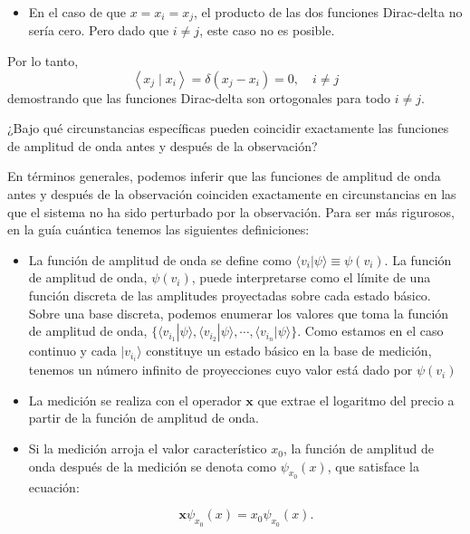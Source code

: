 \begin{problema}
\begin{sol}
\begin{itemize}
    \item En el caso de que $x = x_i = x_j$, el producto de las dos funciones Dirac-delta no sería cero. Pero dado que $i \neq j$, este caso no es posible.
\end{itemize}
Por lo tanto, 
$$\left\langle x_j \mid x_i\right\rangle=\delta\left(x_j-x_i\right)=0, \quad i\neq j$$
demostrando que las funciones Dirac-delta son ortogonales para todo $i\neq j$. 
    \end{sol}
\end{problema}

\begin{problema}
    ¿Bajo qué circunstancias específicas pueden coincidir exactamente las funciones de amplitud de onda antes y después de la observación?
    \begin{sol}
        En términos generales, podemos inferir que las funciones de amplitud de onda antes y después de la observación coinciden exactamente en circunstancias en las que el sistema no ha sido perturbado por la observación. Para ser más rigurosos, en la guía cuántica tenemos las siguientes definiciones: 
        \begin{itemize}
            \item La función de amplitud de onda se define como $\langle v_i|\psi \rangle \equiv \psi(v_i)$. La función de amplitud de onda, $\psi(v_i)$, puede interpretarse como el límite de una función discreta de las amplitudes proyectadas sobre cada estado básico. Sobre una base discreta, podemos enumerar los valores que toma la función de amplitud de onda, $\{\langle v_{i_1}|\psi \rangle  , \langle v_{i_2}|\psi \rangle  , \cdots , \langle v_{i_n}|\psi \rangle  \}$. Como estamos en el caso continuo y cada $| v_{i_i} \rangle$ constituye un estado básico en la base de medición, tenemos un número infinito de proyecciones cuyo valor está dado por $\psi(v_i)$
            
            \item La medición se realiza con el operador $\mathbf{x}$ que extrae el logaritmo del precio a partir de la función de amplitud de onda.
            \item Si la medición arroja el valor característico $x_0$, la función de amplitud de onda después de la medición se denota como $\psi_{x_0}(x)$, que satisface la ecuación:

            \begin{equation*}
            \mathbf{x} \psi_{x_0}(x) = x_0 \psi_{x_0}(x).
            \end{equation*}
            

\end{itemize}
\end{sol}
\end{problema}

